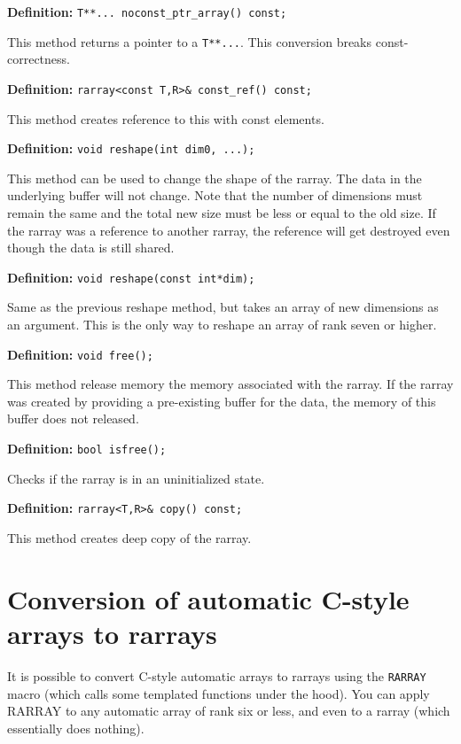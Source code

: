 \documentclass[12pt,twoside]{article}
\begin{document}
\noindent\textbf{Definition:} \texttt{T**... noconst\_ptr\_array() const;}

This method returns a pointer to a \texttt{T**...}. This conversion breaks const-correctness.%


\noindent\textbf{Definition:} \texttt{rarray{\tt<}const T,R{\tt>}\& const\_ref() const;}

This method creates reference to this with const elements.

\noindent\textbf{Definition:} \texttt{void reshape(int dim0, ...);}

This method can be used to change the shape of the rarray. The data in the underlying buffer will not change. Note that the number of dimensions must remain the same and the total new size must be less or equal to the old size. If the rarray was a reference to another rarray, the reference will get destroyed even though the data is still shared.

\noindent\textbf{Definition:} \texttt{void reshape(const int*dim);}

Same as the previous reshape method, but takes an array of new dimensions as an argument.  This is the only way to reshape an array of rank seven or higher.

\noindent\textbf{Definition:} \texttt{void free();}

This method release memory the memory associated with the rarray. If the rarray was created by providing a pre-existing buffer for the data, the memory of this buffer does not released.

\noindent\textbf{Definition:} \texttt{bool isfree();}

Checks if the rarray is in an uninitialized state.

\noindent\textbf{Definition:} \texttt{rarray{\tt<}T,R{\tt>}\& copy() const;}

This method creates deep copy of the rarray.


\section{Conversion of automatic C-style arrays to rarrays}

It is possible to convert C-style automatic arrays to rarrays using the {\tt RARRAY} macro (which calls some templated functions under the hood).  You can apply RARRAY to any automatic array of rank six or less, and even to a rarray (which essentially does nothing). 
\end{document}
